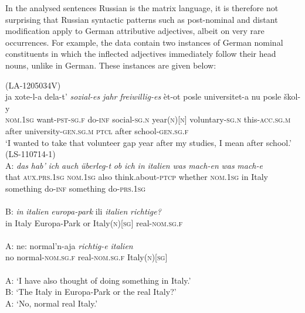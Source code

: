 In the analysed sentences Russian is the matrix language, it is therefore not surprising that Russian syntactic patterns such as post-nominal and distant modification apply to German attributive adjectives, albeit on very rare occurrences. For example, the data contain two instances of German nominal constituents in which the inflected adjectives immediately follow their head nouns, unlike in German. These instances are given below:

\ea
\label{ex:4:29}
(LA-1205034V)\\
 \gll ja xote-l-a dela-t' \textit{sozial-es} \textit{jahr} \textit{freiwillig-es}  èt-ot posle universitet-a nu posle škol-y\\
	\textsc{nom.1sg} want-\textsc{pst-sg.f} do-\textsc{inf} social-\textsc{sg.n} year(\textsc{n})[\textsc{n}] voluntary-\textsc{sg.n} this-\textsc{acc.sg.m} after university-\textsc{gen.sg.m} \textsc{ptcl} after school-\textsc{gen.sg.f}\\
\glt `I wanted to take that volunteer gap year after my studies, I mean after school.'
\ex
\label{ex:4:30}
(LS-110714-1)\\
\gll A: \textit{das} \textit{hab'} \textit{ich} \textit{auch} \textit{überleg-t} \textit{ob} \textit{ich} \textit{in}  \phantom{m} \textit{italien} \textit{was} \textit{mach-en}  \textit{was} \textit{mach-e}\\
	{} that \textsc{aux.prs.1sg} \textsc{nom.1sg} also think.about-\textsc{ptcp} whether \textsc{nom.1sg} in {} Italy something do-\textsc{inf} something do-\textsc{prs.1sg}\\
\glt \hfill \\ 
 \gll B: \textit{in} \textit{italien} \textit{europa-park}  ili \textit{italien} \textit{richtige?}\\
	{} in Italy Europa-Park or Italy(\textsc{n})[\textsc{sg}] real-\textsc{nom.sg.f}\\
	\glt \hfill \\
\gll A: ne: normal'n-aja \textit{richtig-e} \textit{italien}\\
	{}  no normal-\textsc{nom.sg.f} real-\textsc{nom.sg.f} Italy(\textsc{n})[\textsc{sg}]\\
\glt \hfill \\

A: `I have also thought of doing something in Italy.'\\
B: `The Italy in Europa-Park or the  real Italy?'\\
A: `No, normal real Italy.'
\z

